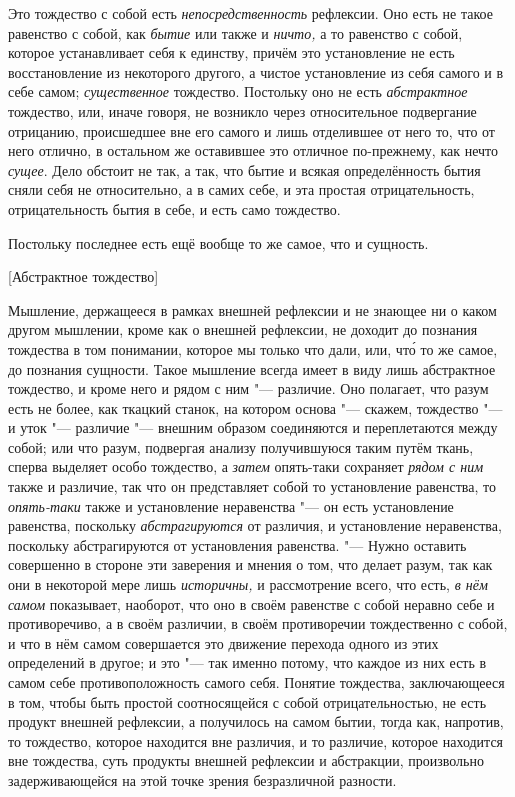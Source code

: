 Это тождество с собой есть {\em непосредственность}
рефлексии. Оно есть не такое равенство с собой, как
{\em бытие} или также и
{\em ничто,} а то равенство с собой, которое
устанавливает себя к единству, причём это установление не есть
восстановление из некоторого другого, а чистое установление из себя самого
и в себе самом; {\em существенное} тождество. Постольку
оно не есть {\em абстрактное} тождество, или, иначе
говоря, не возникло через относительное подвергание отрицанию, происшедшее
вне его самого и лишь отделившее от него то, что от него отлично, в
остальном же оставившее это отличное по-прежнему, как нечто
{\em сущее}. Дело обстоит не так, а так, что бытие и
всякая определённость бытия сняли себя не относительно, а в самих себе, и
эта простая отрицательность, отрицательность бытия в себе, и есть само
тождество.

Постольку последнее есть ещё вообще то же самое, что и сущность.

%
  {[Абстрактное тождество]}

Мышление, держащееся в рамках внешней рефлексии и не знающее ни о каком
другом мышлении, кроме как о внешней рефлексии, не доходит до познания
тождества в том понимании, которое мы только что дали, или, чт\'{о} то же
самое, до познания сущности. Такое мышление всегда имеет в виду лишь
абстрактное тождество, и кроме него и рядом с ним "--- различие. Оно полагает,
что разум есть не более, как ткацкий станок, на котором основа "--- скажем,
тождество "--- и уток "--- различие "--- внешним образом соединяются и переплетаются
между собой; или что разум, подвергая анализу получившуюся таким путём
ткань, сперва выделяет особо тождество, а {\em затем}
опять-таки сохраняет {\em рядом с ним} также и
различие, так что он представляет собой то установление равенства, то
{\em опять-таки} также и установление неравенства "--- он
есть установление равенства, поскольку
{\em абстрагируются} от различия, и установление
неравенства, поскольку абстрагируются от установления равенства. "--- Нужно
оставить совершенно в стороне эти заверения и мнения о том, что делает
разум, так как они в некоторой мере лишь
{\em историчны,} и рассмотрение всего, что есть,
{\em в нём самом} показывает, наоборот, что оно в своём
равенстве с собой неравно себе и противоречиво, а в своём различии, в своём
противоречии тождественно с собой, и что в нём самом совершается это
движение перехода одного из этих определений в другое; и это "--- так именно
потому, что каждое из них есть в самом себе противоположность самого себя.
Понятие тождества, заключающееся в том, чтобы быть простой соотносящейся с
собой отрицательностью, не есть продукт внешней рефлексии, а получилось на
самом бытии, тогда как, напротив, то тождество, которое находится вне
различия, и то различие, которое находится вне тождества, суть продукты
внешней рефлексии и абстракции, произвольно задерживающейся на этой точке
зрения безразличной разности.

